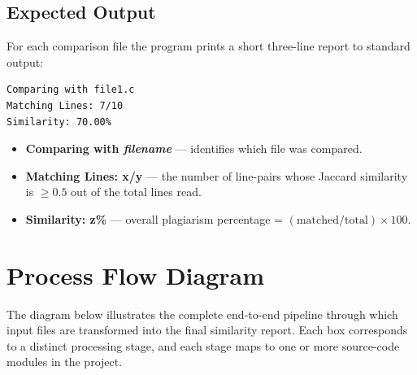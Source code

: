 \documentclass[12pt,a4paper]{article}
\begin{document}
\subsection{Expected Output}

For each comparison file the program prints a short three-line report to standard output:

\begin{lstlisting}[style=bashstyle, caption={Sample program output}]
Comparing with file1.c
Matching Lines: 7/10
Similarity: 70.00%
\end{lstlisting}

\begin{itemize}[leftmargin=1.5cm, itemsep=4pt]
  \item \textbf{Comparing with \textit{filename}} — identifies which file was compared.
  \item \textbf{Matching Lines: x/y} — the number of line-pairs whose Jaccard similarity is $\geq 0.5$ out of the total lines read.
  \item \textbf{Similarity: z\%} — overall plagiarism percentage = $(\text{matched} / \text{total}) \times 100$.
\end{itemize}

\newpage


\section{Process Flow Diagram}

The diagram below illustrates the complete end-to-end pipeline through which input files are transformed into the final similarity report. Each box corresponds to a distinct processing stage, and each stage maps to one or more source-code modules in the project.

\vspace{0.6cm}
\end{document}
